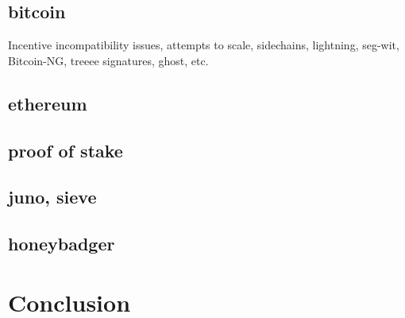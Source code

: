 	\subsection{bitcoin} Incentive incompatibility issues, attempts to scale, sidechains, lightning, seg-wit, Bitcoin-NG,
	treeee signatures, ghost, etc.
	\subsection{ethereum}
	\subsection{proof of stake}
	\subsection{juno, sieve}
	\subsection{honeybadger}


\section{Conclusion}

